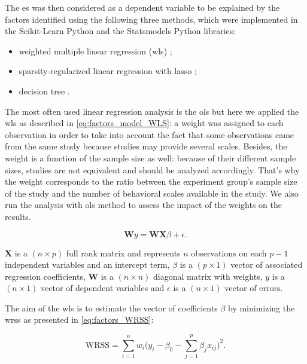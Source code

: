 The \gls{es} was then considered as a dependent variable to be explained by the factors identified using the following three methods, which were 
implemented in the Scikit-Learn Python \citep[version xxx]{Pedregosa2011} and the Statsmodels Python \citep[version xx]{Seabold2010} libraries:
\begin{itemize}
	\item weighted multiple linear regression (\gls{wls}) \citep{Montgomery2012}; 
	\item sparsity-regularized linear regression with \gls{lasso} \citep{Tibshirani1996};
	\item decision tree \citep{Quinlan1986}.
\end{itemize}

The most often used linear regression analysis is the \gls{ols} but here we applied the \gls{wls} as described in \cref{eq:factors_model_WLS}: a 
weight was assigned to each observation in order to take into account the fact that some observations came from the same study because studies 
may provide several scales. Besides, the weight is a function of the sample size  as well: because of their different sample sizes, studies are not 
equivalent and should be analyzed accordingly. That's why the weight corresponds to the ratio between the experiment group's sample size of the study and 
the number of behavioral scales available in the study. We also run the analysis
 with \gls{ols} method to assess the impact of the weights on the results. 

\begin{equation}
\label{eq:factors_model_WLS}
\textbf{W}y = \textbf{WX}\beta + \epsilon.
\end{equation}

$\textbf{X}$ is a $(n \times p)$ full rank matrix and represents $n$ observations on each $p-1$ independent variables and an 
intercept term, $\beta$ is a $(p \times 1)$ vector of associated regression coefficients, $\textbf{W}$ is a $(n \times n)$ diagonal 
matrix with weights, $y$ is a $(n \times 1)$ vector of dependent variables and $\epsilon$ is a $(n \times 1)$ vector of errors.

The aim of the \gls{wls} is to estimate the vector of coefficients $\beta$ by minimizing the \gls{wrss} as presented in \cref{eq:factors_WRSS}:

\begin{equation}
\label{eq:factors_WRSS}
\text{WRSS} = \sum_{i=1}^{n} w_i \Big(y_i - \beta_{0} - \sum_{j=1}^{p}\beta_{j}x_{ij}\Big)^2.
\end{equation}

